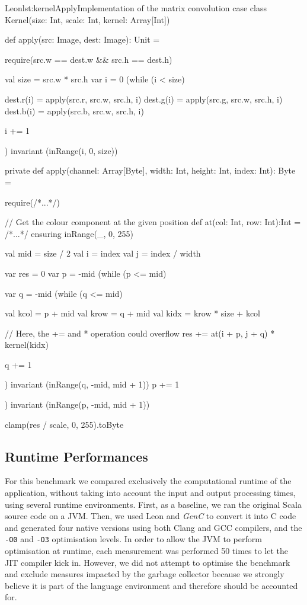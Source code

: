 \documentclass[a4paper,twoside]{article}
\newcommand{\Inline}[1]{\lstinline[basicstyle=\ttfamily]|#1|}
\newcommand{\GenC}{\emph{GenC}\xspace}
\begin{document}
\lstset{numbers=left}
\begin{Code}{Leon}{lst:kernelApply}{Implementation of the matrix convolution}
case class Kernel(size: Int, scale: Int, kernel: Array[Int]) {
  def apply(src: Image, dest: Image): Unit = {
    require(src.w == dest.w && src.h == dest.h)

    val size = src.w * src.h
    var i = 0
    (while (i < size) {
      dest.r(i) = apply(src.r, src.w, src.h, i)
      dest.g(i) = apply(src.g, src.w, src.h, i)
      dest.b(i) = apply(src.b, src.w, src.h, i)

      i += 1
    }) invariant (inRange(i, 0, size))
  }

  private def apply(channel: Array[Byte],
                    width: Int, height: Int, index: Int): Byte = {
    require(/*...*/)

    // Get the colour component at the given position
    def at(col: Int, row: Int):Int = {/*...*/} ensuring { inRange(_, 0, 255) }

    val mid = size / 2
    val i = index %
    val j = index / width

    var res = 0
    var p   = -mid
    (while (p <= mid) {
      var q = -mid
      (while (q <= mid) {
        val kcol = p + mid
        val krow = q + mid
        val kidx = krow * size + kcol

        // Here, the += and * operation could overflow
        res += at(i + p, j + q) * kernel(kidx)

        q += 1
      }) invariant (inRange(q, -mid, mid + 1))
      p += 1
    }) invariant (inRange(p, -mid, mid + 1))

    clamp(res / scale, 0, 255).toByte
  }
}
\end{Code}
\lstset{numbers=none}

\subsection{Runtime Performances}

For this benchmark we compared exclusively the computational runtime of the
application, without taking into account the input and output processing times,
using several runtime environments. First, as a baseline, we ran the original
Scala source code on a JVM. Then, we used Leon and \GenC to convert it into C
code and generated four native versions using both Clang and GCC compilers, and
the \Inline{-O0} and \Inline{-O3} optimisation levels. In order to allow the JVM
to perform optimisation at runtime, each measurement was performed 50 times to
let the JIT compiler kick in. However, we did not attempt to optimise the
benchmark and exclude measures impacted by the garbage collector because we
strongly believe it is part of the language environment and therefore should be
accounted for.
\end{document}
